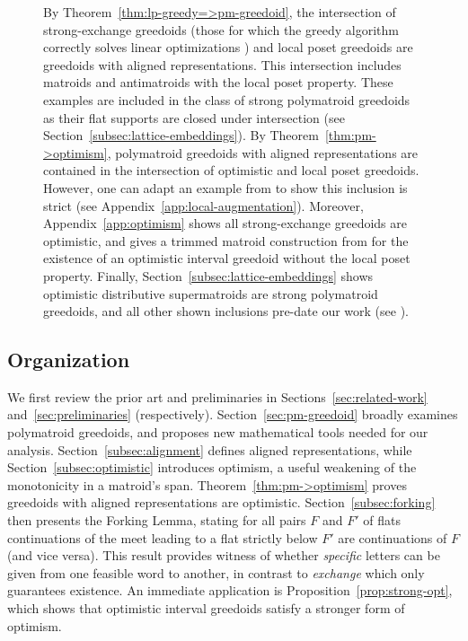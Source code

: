 \documentclass[11pt]{article}
\begin{document}
\begin{figure}[t!]
    \centering
    \scalebox{.65}{}
    \caption{
        By Theorem~\ref{thm:lp-greedy=>pm-greedoid}, the intersection of strong-exchange greedoids (those for which the greedy algorithm correctly solves linear optimizations \cite{goetschel1986linear,korte1984greedoids}) and local poset greedoids are greedoids with aligned representations.
    This intersection includes matroids and antimatroids with the local poset property.
    These examples are included in the class of strong polymatroid greedoids as their flat supports are closed under intersection (see Section~\ref{subsec:lattice-embeddings}).
    By Theorem~\ref{thm:pm->optimism}, polymatroid greedoids with aligned representations are contained in the intersection of optimistic and local poset greedoids.
    However, one can adapt an example from \cite{korte1988intersection} to show this inclusion is strict (see Appendix~\ref{app:local-augmentation}).
    Moreover, Appendix~\ref{app:optimism} shows all strong-exchange greedoids are optimistic, and gives a trimmed matroid construction from \cite{korte1988intersection} for the existence of an optimistic interval greedoid without the local poset property.
    Finally, Section~\ref{subsec:lattice-embeddings} shows optimistic distributive supermatroids are strong polymatroid greedoids, and all other shown inclusions pre-date our work (see \cite{korte2012greedoids}).}
    \label{fig:tax}
\end{figure}

\subsection{Organization}
We first review the prior art and preliminaries in Sections~\ref{sec:related-work} and~\ref{sec:preliminaries} (respectively).
Section~\ref{sec:pm-greedoid} broadly examines polymatroid greedoids, and proposes new mathematical tools needed for our analysis.
Section~\ref{subsec:alignment} defines aligned representations, while 
Section~\ref{subsec:optimistic} introduces optimism, a useful weakening of the monotonicity in a matroid's span. Theorem~\ref{thm:pm->optimism} proves greedoids with aligned representations are optimistic.
Section~\ref{subsec:forking} then presents the Forking Lemma, stating for all pairs $F$ and $F'$ of flats continuations of the meet leading to a flat strictly below $F'$ are continuations of $F$ (and vice versa).
This result provides witness of whether \emph{specific} letters can be given from one feasible word to another, in contrast to \emph{exchange} which only guarantees existence.
An immediate application is Proposition~\ref{prop:strong-opt}, which shows that optimistic interval greedoids satisfy a stronger form of optimism.
\end{document}
